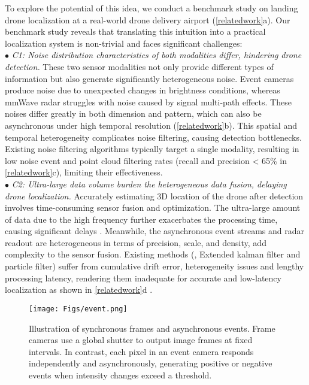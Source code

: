To explore the potential of this idea, we conduct a benchmark study on landing drone localization at a real-world drone delivery airport (\fig \ref{relatedwork}a). 
Our benchmark study reveals that translating this intuition into a practical localization system is non-trivial and faces significant challenges:\\
\noindent $\bullet$ \textit{C1: Noise distribution characteristics of both modalities differ, hindering drone detection.}
These two sensor modalities not only provide different types of information but also generate significantly heterogeneous noise. 
Event cameras produce noise due to unexpected changes in brightness conditions, whereas mmWave radar struggles with noise caused by signal multi-path effects.
These noises differ greatly in both dimension and pattern, which can also be asynchronous under high temporal resolution (\fig \ref{relatedwork}b).
This spatial and temporal heterogeneity complicates noise filtering, causing detection bottlenecks.
Existing noise filtering algorithms \cite{cao2024virteach, liu2024pmtrack, wang2021asynchronous, alzugaray2018asynchronous}  typically target a single modality, resulting in low noise event and point cloud filtering rates (recall and precision < 65\% in \fig \ref{relatedwork}c), limiting their effectiveness.\\
\noindent $\bullet$ \textit{C2: Ultra-large data volume burden the heterogeneous data fusion, delaying drone localization.}
Accurately estimating 3D location of the drone after detection involves time-consuming sensor fusion and optimization. 
The ultra-large amount of data due to the high frequency further exacerbates the processing time, causing significant delays \cite{xu2021followupar}.
Meanwhile, the asynchronous event streams and radar readout are heterogeneous in terms of precision, scale, and density, add complexity to the sensor fusion.
Existing methods (\eg, Extended kalman filter and particle filter) suffer from cumulative drift error, heterogeneity issues and lengthy processing latency, rendering them inadequate for accurate and low-latency localization as shown in \fig \ref{relatedwork}d \cite{zhao20213d, falanga2020dynamic, mitrokhin2018event}. 

\begin{figure}[t]
    \setlength{\abovecaptionskip}{0.2cm} %
    \setlength{\belowcaptionskip}{-0.3cm}
    \setlength{\subfigcapskip}{-0.25cm}
    \centering
        \texttt{[image: Figs/event.png]}
        \vspace{-0.5cm}
    \caption{Illustration of synchronous frames and asynchronous events. \textnormal{Frame cameras use a global shutter to output image frames at fixed intervals. In contrast, each pixel in an event camera responds independently and asynchronously, generating positive or negative events when intensity changes exceed a threshold.}}
    \label{event}
    \vspace{-0.4cm}
\end{figure} 

